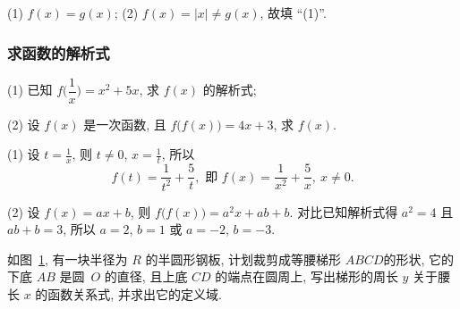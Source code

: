   \beginsolution
    (1) $f(x)=g(x)$; (2) $f(x)=|x|\neq g(x)$, 故填 ``(1)''.
  \endsolution
  
  \subsubsection{求函数的解析式}
  \begin{example}
    (1) 已知 $f\Big(\dfrac1x\Big)= x^2+5x$, 求 $f(x)$ 的解析式;

    (2) 设 $f(x)$ 是一次函数, 且 $f\bigl(f(x)\bigr)=4x+3$, 
      求 $f(x)$.
  \end{example}

  \beginsolution
    (1) 设 $t=\frac1x$, 则 $t\neq 0$, $x=\frac1t$, 所以 \[f(t)=\frac1{t^2}+\frac5t,\text{\ 即\ }f(x)=\frac1{x^2}+\frac5x,\ x\neq 0.\]
    
    (2) 设 $f(x)=ax+b$, 则 $f\bigl(f(x)\bigr)= a^2 x+ab+b$. 对比已知解析式得 $a^2=4$ 且 $ab+b=3$, 所以 $a=2$, $b=1$ 或 $a=-2$, $b=-3$.
  \endsolution
  
  \begin{example}
    如图~\ref{fig-190215-2300}, 有一块半径为 $R$ 的半圆形钢板, 
    计划裁剪成等腰梯形 $ABCD$的形状, 
    它的下底 $AB$ 是圆~$O$ 的直径, 且上底 $CD$ 的端点在圆周上, 
    写出梯形的周长 $y$ 关于腰长 $x$ 的函数关系式, 并求出它的定义域.
    \begin{figure}[htb]
      \small\centering
      \caption{}\label{fig-190215-2300}
    \end{figure}
  \end{example}


